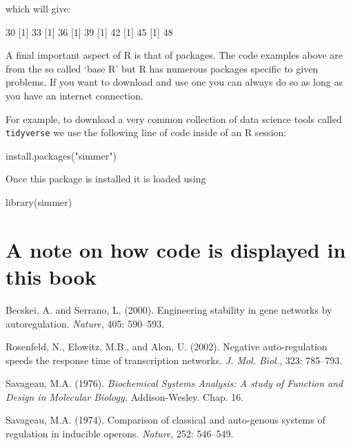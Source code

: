 which will give:

\begin{Rout}
[1] 30
[1] 33
[1] 36
[1] 39
[1] 42
[1] 45
[1] 48
\end{Rout}

A final important aspect of R is that of packages. The code examples above
are from the so called `base R' but R has numerous packages
specific to given problems. If you want to download and use one you can always
do so as long as you have an internet connection.

For example, to download a very common collection of data science tools called
\texttt{tidyverse}
we use the following line of code inside of an R session:

\begin{Rin-no-test}
install.packages("simmer")
\end{Rin-no-test}

Once this package is installed it is loaded using

\begin{Rin}
library(simmer)
\end{Rin}

\section{A note on how code is displayed in this
book}\label{sec:a-note-on-how-code-is-displayed-in-this-book}


\begin{thefurtherreading}{99}  %

\bibitem{} Becskei, A. and Serrano, L. (2000). Engineering stability in gene
networks by autoregulation. \textit{Nature, }405: 590--593.

\bibitem{} Rosenfeld, N., Elowitz, M.B., and Alon, U. (2002). Negative
auto-regulation speeds the response time of transcription networks. \textit{J.
Mol. Biol.}, 323: 785--793.

\bibitem{} Savageau, M.A. (1976). \textit{Biochemical Systems Analysis: A study
of Function and Design in Molecular Biology. }Addison-Wesley. Chap. 16.

\bibitem{} Savageau, M.A. (1974). Comparison of classical and auto-genous
systems of regulation in inducible operons. \textit{Nature}, 252: 546--549.
\end{thefurtherreading}
